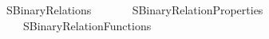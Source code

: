 %
\begin{isabellebody}%
%
%
\isadelimdocument
%
\endisadelimdocument
%
\isatagdocument
%
\isamarkuptrue%
%
\endisatagdocument
{\isafolddocument}%
%
\isadelimdocument
%
\endisadelimdocument
%
\isadelimtheory
%
\endisadelimtheory
%
\isatagtheory
{}\isamarkupfalse%
\ SBinary{\isacharunderscore}{\kern0pt}Relations\isanewline
\ \ \isanewline
\ \ \ \ SBinary{\isacharunderscore}{\kern0pt}Relation{\isacharunderscore}{\kern0pt}Properties\isanewline
\ \ \ \ SBinary{\isacharunderscore}{\kern0pt}Relation{\isacharunderscore}{\kern0pt}Functions\isanewline
{}\isanewline
\isanewline
\isanewline
{}\isamarkupfalse%
%
\endisatagtheory
{\isafoldtheory}%
%
\isadelimtheory
%
\endisadelimtheory
%
\end{isabellebody}%
\endinput
